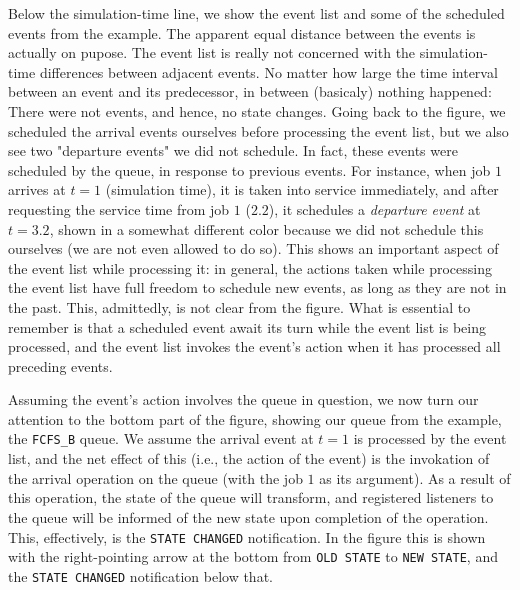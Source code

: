 \documentclass[12pt]{book}
\begin{document}
Below the simulation-time line,
  we show the event list and some of the scheduled events
  from the example.
The apparent equal distance between the events
  is actually on pupose.
The event list is really not concerned with the
  simulation-time differences between adjacent events.
No matter how large the time interval between an
  event and its predecessor,
  in between (basicaly) nothing happened:
  There were not events,
  and hence,
  no state changes.
Going back to the figure,
  we scheduled the arrival events ourselves
  before processing the event list,
  but we also see two "departure events"
  we did not schedule.
In fact, these events were scheduled by the
  queue, in response to previous events.
For instance, when job $1$ arrives at $t=1$ (simulation time),
  it is taken into service immediately,
  and after requesting the service time from job $1$ ($2.2$),
  it schedules a {\em departure event\/} at $t=3.2$,
  shown in a somewhat different color because we
  did not schedule this ourselves (we are not even allowed to do so).
This shows an important aspect of the event list while processing it:
  in general, the actions taken while processing the event list have
  full freedom to schedule new events,
  as long as they are not in the past.
This, admittedly, is not clear from the figure.
What is essential to remember is that a scheduled event
  await its turn while the event list is being processed,
  and the event list invokes the event's action
  when it has processed all preceding events.

Assuming the event's action involves the queue in question,
  we now turn our attention to the bottom part of the figure,
  showing our queue from the example, the \lstinline|FCFS_B| queue.
We assume the arrival event at $t=1$ is processed by the event list,
  and the net effect of this (i.e., the action of the event)
  is the invokation of the arrival operation on the queue
  (with the job $1$ as its argument).
As a result of this operation,
  the state of the queue will transform,
  and registered listeners to the queue will be informed
  of the new state upon completion of the operation.
This, effectively, is the \lstinline|STATE CHANGED| notification.
In the figure this is shown with the right-pointing arrow at the bottom
  from \lstinline|OLD STATE| to \lstinline|NEW STATE|,
  and the \lstinline|STATE CHANGED| notification below that.
\end{document}
